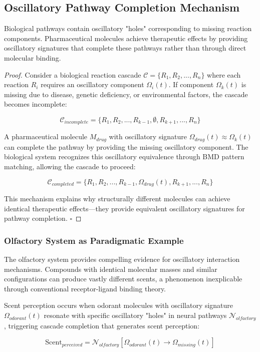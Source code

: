 \subsection{Oscillatory Pathway Completion Mechanism}

\begin{theorem}
Biological pathways contain oscillatory "holes" corresponding to missing reaction components. Pharmaceutical molecules achieve therapeutic effects by providing oscillatory signatures that complete these pathways rather than through direct molecular binding.
\end{theorem}

\begin{proof}
Consider a biological reaction cascade $\mathcal{C} = \{R_1, R_2, ..., R_n\}$ where each reaction $R_i$ requires an oscillatory component $\Omega_i(t)$. If component $\Omega_k(t)$ is missing due to disease, genetic deficiency, or environmental factors, the cascade becomes incomplete:

$$\mathcal{C}_{incomplete} = \{R_1, R_2, ..., R_{k-1}, \emptyset, R_{k+1}, ..., R_n\}$$

A pharmaceutical molecule $M_{drug}$ with oscillatory signature $\Omega_{drug}(t) \approx \Omega_k(t)$ can complete the pathway by providing the missing oscillatory component. The biological system recognizes this oscillatory equivalence through BMD pattern matching, allowing the cascade to proceed:

$$\mathcal{C}_{completed} = \{R_1, R_2, ..., R_{k-1}, \Omega_{drug}(t), R_{k+1}, ..., R_n\}$$

This mechanism explains why structurally different molecules can achieve identical therapeutic effects—they provide equivalent oscillatory signatures for pathway completion. $\square$
\end{proof}

\subsubsection{Olfactory System as Paradigmatic Example}

The olfactory system provides compelling evidence for oscillatory interaction mechanisms. Compounds with identical molecular masses and similar configurations can produce vastly different scents, a phenomenon inexplicable through conventional receptor-ligand binding theory.

\begin{definition}
Scent perception occurs when odorant molecules with oscillatory signature $\Omega_{odorant}(t)$ resonate with specific oscillatory "holes" in neural pathways $\mathcal{N}_{olfactory}$, triggering cascade completion that generates scent perception:

\begin{equation}
\text{Scent}_{perceived} = \mathcal{N}_{olfactory}[\Omega_{odorant}(t) \rightarrow \Omega_{missing}(t)]
\end{equation}
\end{definition}


